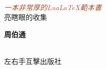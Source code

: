 \begin{titlepage} %

  \centering %


  \setlength{\unitlength}{0.6\textwidth} %

  {\color{LightGoldenrod}}\\[\baselineskip] %

  \textcolor{Sienna}{\textit{\Huge 一本非常厚的Lua\LaTeX{}範本書}}\\[\baselineskip] %

  {\color{RosyBrown}\Large 亮瞎眼的收集}\\ %

  {\color{LightGoldenrod}} %

  \vfill %


  {\Large\textbf{周伯通}}\\ %

  \vfill %


  \plogo\\[0.5\baselineskip] %

  左右手互擊出版社 %

\end{titlepage}



